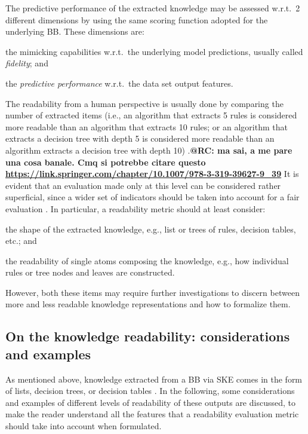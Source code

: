 \documentclass{article}
\newenvironment{inlinelist}{\begin{enumerate*}[label=\emph{(\roman{*})}]}{\end{enumerate*}}
\begin{document}
The predictive performance of the extracted knowledge may be assessed w.r.t.\ 2 different dimensions by using the same scoring function adopted for the underlying BB.
%
These dimensions are:
%
\begin{inlinelist}
	\item the mimicking capabilities w.r.t.\ the underlying model predictions, usually called \emph{fidelity}; and
	\item the \emph{predictive performance} w.r.t.\ the data set output features.
\end{inlinelist}

The readability from a human perspective is usually done by comparing the number of extracted items (i.e., an algorithm that extracts 5 rules is considered more readable than an algorithm that extracts 10 rules; or an algorithm that extracts a decision tree with depth 5 is considered more readable than an algorithm extracts a decision tree with depth 10) \cite{literature}.\textbf{@RC: ma sai, a me pare una cosa banale. Cmq si potrebbe citare questo \url{https://link.springer.com/chapter/10.1007/978-3-319-39627-9\_39}}
% 
It is evident that an evaluation made only at this level can be considered rather superficial, since a wider set of indicators should be taken into account for a fair evaluation \cite{sabbatini2022-metrics}.
%
In particular, a readability metric should at least consider:
%
\begin{inlinelist}
	\item the shape of the extracted knowledge, e.g., list or trees of rules, decision tables, etc.; and
	\item the readability of single atoms composing the knowledge, e.g., how individual rules or tree nodes and leaves are constructed.
\end{inlinelist}
%
However, both these items may require further investigations to discern between more and less readable knowledge representations and how to formalize them.

\subsection{On the knowledge readability: considerations and examples}\label{ssec:motivation}
As mentioned above, knowledge extracted from a BB via SKE comes in the form of lists, decision trees, or decision tables \cite{guidotti2018survey,huysmans2011empirical}. 
%
In the following, some considerations and examples of different levels of readability of these outputs are discussed, to make the reader understand all the features that a readability evaluation metric should take into account when formulated.
\end{document}
